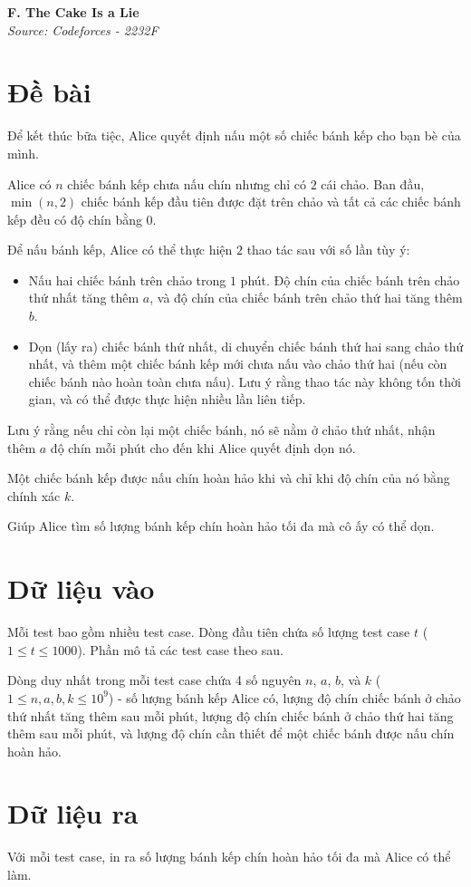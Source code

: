 \documentclass[11pt]{article}
\newcommand{\problem}[2]{
    \begin{problembox}
    \begin{center}
        \Large \textbf{#1} \\
        \vspace{0.2cm}
        \small \textit{Source: #2}
    \end{center}
    \end{problembox}
}
\begin{document}
\newpage
\problem{F. The Cake Is a Lie}{Codeforces - 2232F}

\section*{Đề bài}
Để kết thúc bữa tiệc, Alice quyết định nấu một số chiếc bánh kếp cho bạn bè của mình.

Alice có $n$ chiếc bánh kếp chưa nấu chín nhưng chỉ có $2$ cái chảo. Ban đầu, $\min(n, 2)$ chiếc bánh kếp đầu tiên được đặt trên chảo và tất cả các chiếc bánh kếp đều có độ chín bằng $0$.

Để nấu bánh kếp, Alice có thể thực hiện $2$ thao tác sau với số lần tùy ý:
\begin{itemize}
    \item Nấu hai chiếc bánh trên chảo trong $1$ phút. Độ chín của chiếc bánh trên chảo thứ nhất tăng thêm $a$, và độ chín của chiếc bánh trên chảo thứ hai tăng thêm $b$.
    \item Dọn (lấy ra) chiếc bánh thứ nhất, di chuyển chiếc bánh thứ hai sang chảo thứ nhất, và thêm một chiếc bánh kếp mới chưa nấu vào chảo thứ hai (nếu còn chiếc bánh nào hoàn toàn chưa nấu). Lưu ý rằng thao tác này không tốn thời gian, và có thể được thực hiện nhiều lần liên tiếp.
\end{itemize}

Lưu ý rằng nếu chỉ còn lại một chiếc bánh, nó sẽ nằm ở chảo thứ nhất, nhận thêm $a$ độ chín mỗi phút cho đến khi Alice quyết định dọn nó.

Một chiếc bánh kếp được nấu chín hoàn hảo khi và chỉ khi độ chín của nó bằng chính xác $k$.

Giúp Alice tìm số lượng bánh kếp chín hoàn hảo tối đa mà cô ấy có thể dọn.

\section*{Dữ liệu vào}
Mỗi test bao gồm nhiều test case. Dòng đầu tiên chứa số lượng test case $t$ ($1 \le t \le 1000$). Phần mô tả các test case theo sau.

Dòng duy nhất trong mỗi test case chứa 4 số nguyên $n$, $a$, $b$, và $k$ ($1 \le n, a, b, k \le 10^9$) - số lượng bánh kếp Alice có, lượng độ chín chiếc bánh ở chảo thứ nhất tăng thêm sau mỗi phút, lượng độ chín chiếc bánh ở chảo thứ hai tăng thêm sau mỗi phút, và lượng độ chín cần thiết để một chiếc bánh được nấu chín hoàn hảo.

\section*{Dữ liệu ra}
Với mỗi test case, in ra số lượng bánh kếp chín hoàn hảo tối đa mà Alice có thể làm.
\end{document}
